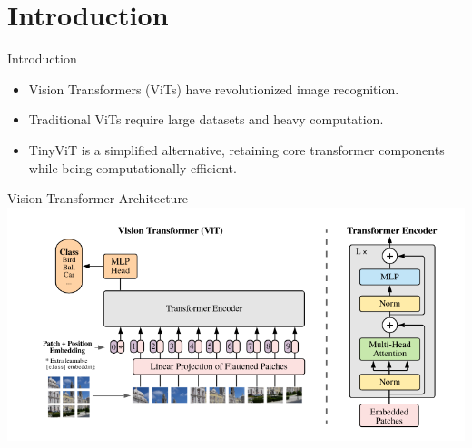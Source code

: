 \section{Introduction}

\begin{frame}{Introduction}
    \begin{itemize}
        \item Vision Transformers (ViTs) have revolutionized image recognition.
        \item Traditional ViTs require large datasets and heavy computation.
        \item TinyViT is a simplified alternative, retaining core transformer components while being computationally efficient.
    \end{itemize}
\end{frame}

\begin{frame}{Vision Transformer Architecture}
  \includegraphics[width=\textwidth]{images/vit-architecture.png}
\end{frame}

